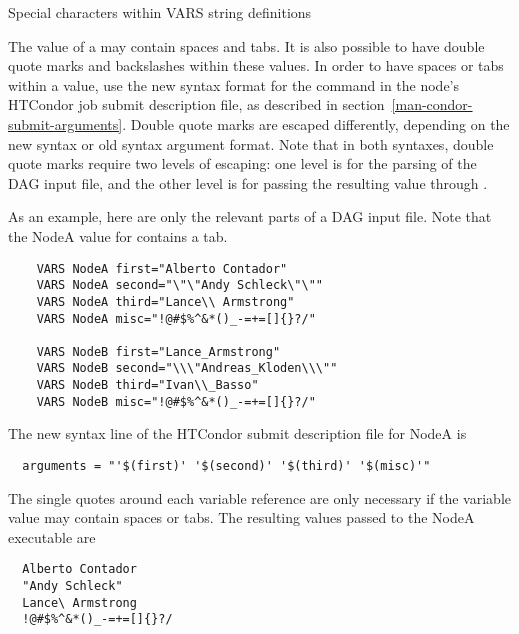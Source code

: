 \begin{description}
\item[Special characters within VARS string definitions]
\end{description}

The value of a   may contain spaces and tabs.
It is also possible to have double quote marks and
backslashes within these values.
In order to have spaces or tabs within a value,
use the new syntax format for the  command
in the node's HTCondor job submit description file,
as described in section~\ref{man-condor-submit-arguments}.
Double quote marks are escaped differently,
depending on the new syntax or old syntax argument format.
Note that in both syntaxes,
double quote marks require two levels of escaping:
one level is for the parsing of the DAG input file, and the other level is for
passing the resulting value through .

As an example, here are only the relevant parts of a DAG input file.
Note that the NodeA value for  contains a tab.
\footnotesize
\begin{verbatim}
    VARS NodeA first="Alberto Contador"
    VARS NodeA second="\"\"Andy	Schleck\"\""
    VARS NodeA third="Lance\\ Armstrong"
    VARS NodeA misc="!@#$%^&*()_-=+=[]{}?/"
    
    VARS NodeB first="Lance_Armstrong"
    VARS NodeB second="\\\"Andreas_Kloden\\\""
    VARS NodeB third="Ivan\\_Basso"
    VARS NodeB misc="!@#$%^&*()_-=+=[]{}?/"
\end{verbatim}
\normalsize

The new syntax  line of the HTCondor submit description file
for NodeA is
\footnotesize
\begin{verbatim}
  arguments = "'$(first)' '$(second)' '$(third)' '$(misc)'"
\end{verbatim}
\normalsize
The single quotes around each variable reference are only necessary
if the variable value may contain spaces or tabs.
The resulting values passed to the NodeA executable are
\footnotesize
\begin{verbatim}
  Alberto Contador
  "Andy	Schleck"
  Lance\ Armstrong
  !@#$%^&*()_-=+=[]{}?/
\end{verbatim}
\normalsize


